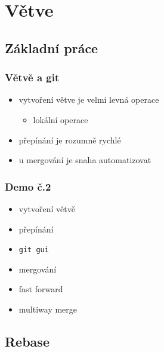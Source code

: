 \documentclass[pdftex]{beamer}
\begin{document}
\section{Větve}
\subsection{Základní práce}

\begin{frame}
	\frametitle{Větvě a git}
	\begin{itemize}
		\item vytvoření větve je velmi levná operace
		\begin{itemize}
			\item lokální operace
		\end{itemize}
		\item přepínání je rozumně rychlé
		\item u mergování je snaha automatizovat
	\end{itemize}
\end{frame}

\begin{frame}
	\frametitle{Demo č.2}
	\begin{itemize}
		\item vytvoření větvě
		\item přepínání
		\item \texttt{git gui}
		\item mergování
		\item fast forward
		\item multiway merge
	\end{itemize}
\end{frame}

\subsection{Rebase}
\end{document}
